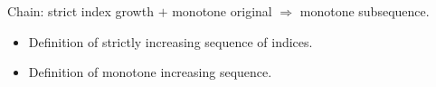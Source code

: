 \begin{remark*}
Chain: strict index growth $+$ monotone original $\Rightarrow$ monotone subsequence.
\end{remark*}

\begin{remark*}[Dependencies]
\begin{itemize}
  \item Definition of strictly increasing sequence of indices.
  \item Definition of monotone increasing sequence.
\end{itemize}
\end{remark*}
